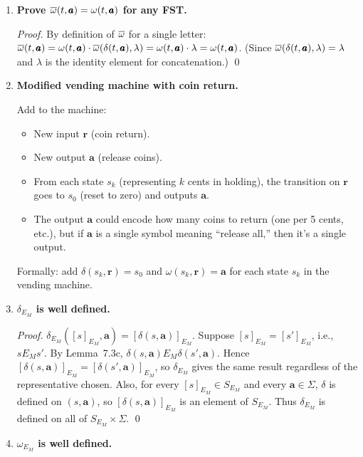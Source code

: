 \begin{enumerate}[{7.}1.]
\item \textbf{Prove $\overline{\omega}(t,\pmb{a})=\omega(t,\pmb{a})$ for any FST.}

\begin{proof}
By definition of $\overline{\omega}$ for a single letter:
$\overline{\omega}(t,\pmb{a})=\omega(t,\pmb{a})\cdot\overline{\omega}(\delta(t,\pmb{a}),\lambda)
=\omega(t,\pmb{a})\cdot\lambda=\omega(t,\pmb{a})$.
(Since $\overline{\omega}(\delta(t,\pmb{a}),\lambda)=\lambda$ and $\lambda$ is the identity element for concatenation.) \qed
\end{proof}

\item \textbf{Modified vending machine with coin return.}

Add to the machine:
\begin{itemize}
  \item New input $\pmb{r}$ (coin return).
  \item New output $\pmb{a}$ (release coins).
  \item From each state $s_k$ (representing $k$ cents in holding), the transition on $\pmb{r}$ goes to $s_0$ (reset to zero) and outputs $\pmb{a}$.
  \item The output $\pmb{a}$ could encode how many coins to return (one per 5 cents, etc.), but if $\pmb{a}$ is a single symbol meaning ``release all,'' then it's a single output.
\end{itemize}

Formally: add $\delta(s_k,\pmb{r})=s_0$ and $\omega(s_k,\pmb{r})=\pmb{a}$ for each state $s_k$ in the vending machine.

\item \textbf{$\delta_{E_M}$ is well defined.}

\begin{proof}
$\delta_{E_M}([s]_{E_M},\pmb{a})=[\delta(s,\pmb{a})]_{E_M}$.  Suppose $[s]_{E_M}=[s']_{E_M}$, i.e., $s E_M s'$.  By Lemma~7.3c, $\delta(s,\pmb{a}) E_M \delta(s',\pmb{a})$.  Hence $[\delta(s,\pmb{a})]_{E_M}=[\delta(s',\pmb{a})]_{E_M}$, so $\delta_{E_M}$ gives the same result regardless of the representative chosen.
Also, for every $[s]_{E_M}\in S_{E_M}$ and every $\pmb{a}\in\Sigma$, $\delta$ is
defined on $(s,\pmb{a})$, so $[\delta(s,\pmb{a})]_{E_M}$ is an element of
$S_{E_M}$.  Thus $\delta_{E_M}$ is defined on all of
$S_{E_M}\times\Sigma$. \qed
\end{proof}

\item \textbf{$\omega_{E_M}$ is well defined.}


\end{enumerate}
